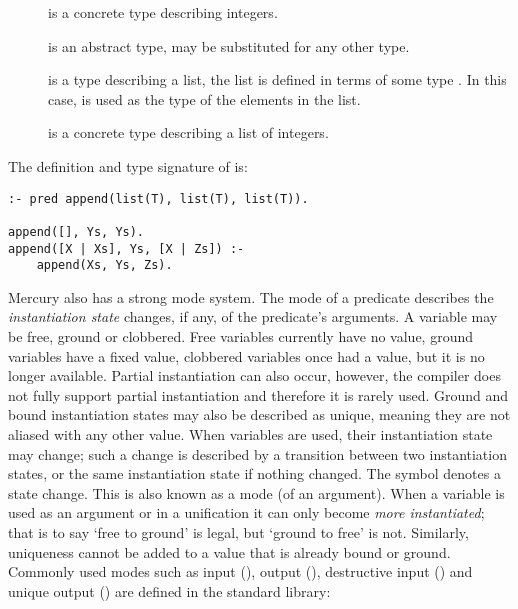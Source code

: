 \begin{description}

    \item[] is a concrete type describing integers.

    \item[] is an abstract type,  may be substituted for any other
    type.

    \item[] is a type describing a list, the list is defined
    in terms of some type .
    In this case,  is used as the type of the elements in the list.

    \item[] is a concrete type describing a list of
    integers.

\end{description}

\noindent
The definition and type signature of  is:

\begin{verbatim}
:- pred append(list(T), list(T), list(T)).

append([], Ys, Ys).
append([X | Xs], Ys, [X | Zs]) :-
    append(Xs, Ys, Zs).
\end{verbatim}

\noindent
Mercury also has a strong mode system.
The mode of a predicate describes the \emph{instantiation state} changes,
if any, of the predicate's arguments.
A variable may be free, ground or clobbered.
Free variables currently have no value,
ground variables have a fixed value,
clobbered variables once had a value, but it is no longer available.
Partial instantiation can also occur,
however, the compiler does not fully support partial instantiation
and therefore it is rarely used.
Ground and bound instantiation states may also be described as unique,
meaning they are not aliased with any other value.
When variables are used, their instantiation state may change;
such a change is described by a transition between two instantiation states,
or the same instantiation state if nothing changed.
The symbol \code{>>} denotes a state change.
This is also known as a mode (of an argument).
When a variable is used as an argument or in a unification it can only
become \emph{more instantiated};
that is to say `free to ground' is legal, but `ground to free' is not.
Similarly, uniqueness cannot be added to a value that is already
bound or ground.
Commonly used modes such as input (), output (),
destructive input () and unique output () are
defined in the standard library:

